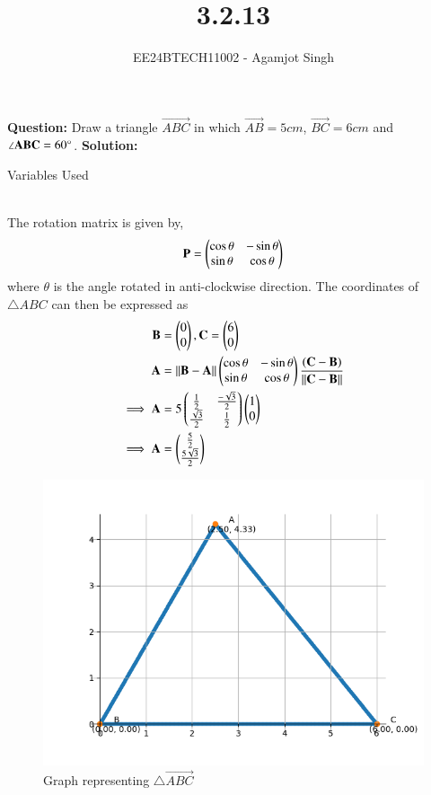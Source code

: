 \documentclass[journal]{IEEEtran}
\begin{document}

\vspace{3cm}

\title{3.2.13}
\author{EE24BTECH11002 - Agamjot Singh}
{\let\newpage\relax\maketitle}

\renewcommand{\thefigure}{\theenumi}
\renewcommand{\thetable}{\theenumi}
\setlength{\intextsep}{10pt} %

\textbf{Question:}
\newline
Draw a triangle $\vec{ABC}$ in which $\vec{AB} = 5 cm$, $\vec{BC} = 6 cm$ and $\angle\mathbf{ABC} = 60\degree$.
\newline
\textbf{Solution:}
\newline
\begin{table}[h!]    
	\centering
	
	\caption{Variables Used}
	\label{tab1-1.5-29}
\end{table}\\
The rotation matrix  is given by,
\begin{align}
	\mathbf{P} = \begin{pmatrix}\cos{\theta} & -\sin{\theta}\\\sin{\theta} & \cos{\theta}\end{pmatrix}
\end{align}
where $\theta$ is the angle rotated in anti-clockwise direction.
\newline
The coordinates of $\triangle ABC$ can then be expressed as
\begin{align}
	\mathbf{B} &= \begin{pmatrix}0\\0\end{pmatrix}, \mathbf{C} = \begin{pmatrix}6\\0\end{pmatrix}\\ 
	\mathbf{A} &= \left\lVert\mathbf{B} - \mathbf{A}\right\rVert\begin{pmatrix}\cos{\theta} & -\sin{\theta}\\\sin{\theta} & \cos{\theta}\end{pmatrix}\frac{\left(\mathbf{C} - \mathbf{B}\right)}{\left\lVert\mathbf{C} - \mathbf{B}\right\rVert}\\
	\implies \mathbf{A} &= 5\begin{pmatrix}\frac{1}{2} & \frac{-\sqrt{3}}{2}\\\frac{\sqrt{3}}{2} & \frac{1}{2}\end{pmatrix}\begin{pmatrix}1\\0\end{pmatrix}\\
	\implies \mathbf{A} &= \begin{pmatrix}\frac{5}{2}\\\frac{5\sqrt{3}}{2}\end{pmatrix}
\end{align}

\begin{figure}[h!]
   \centering
   \includegraphics[width=0.7\linewidth]{figs/graph.png}
   \caption{Graph representing $\triangle \vec{ABC}$}
\end{figure}
\end{document}

